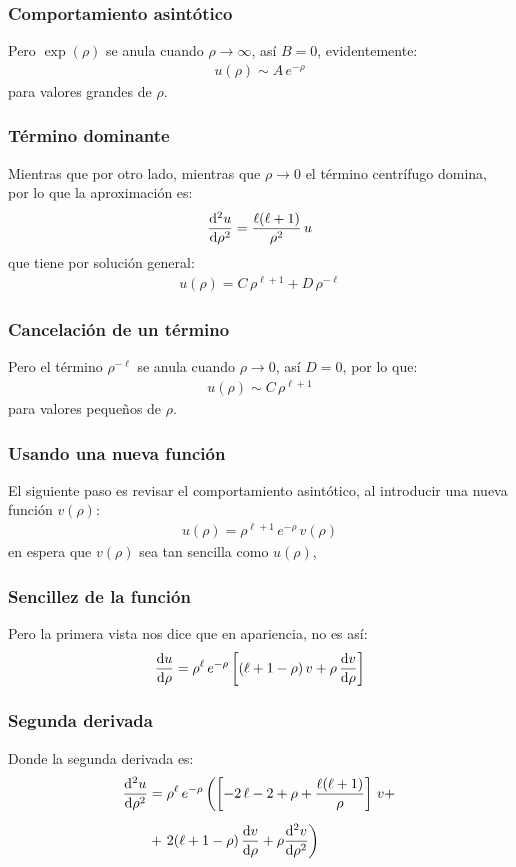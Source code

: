 \documentclass[12pt]{beamer}
\begin{document}
\begin{frame}
\frametitle{Comportamiento asintótico}
Pero $\exp (\rho)$ se anula cuando $\rho \to \infty$, así $B = 0$, evidentemente:
\begin{align}
u(\rho) \sim A \, e^{-\rho}
\label{eq:ecuacion_04_58}
\end{align}
para valores grandes de $\rho$. 
\end{frame}
\begin{frame}
\frametitle{Término dominante}
Mientras que por otro lado, mientras que $\rho \to 0$ el término centrífugo domina, por lo que la aproximación es:
\pause
\begin{align*}
\dv[2]{u}{\rho} = \dfrac{\ell (\ell + 1)}{\rho^{2}} \, u
\end{align*}
\pause
que tiene por solución general:
\begin{align*}
u (\rho) = C \, \rho^{\ell +1} + D \, \rho^{-\ell}
\end{align*}
\end{frame}
\begin{frame}
\frametitle{Cancelación de un término}
Pero el término $\rho^{-\ell}$ se anula cuando $\rho \to 0$, así $D = 0$, por lo que:
\pause
\begin{align}
u (\rho) \sim C \, \rho^{\ell + 1}
\label{eq:ecuacion_04_59}
\end{align}
para valores pequeños de $\rho$.
\end{frame}
\begin{frame}
\frametitle{Usando una nueva función}
El siguiente paso es revisar el comportamiento asintótico, al introducir una nueva función $v (\rho)$:
\pause
\begin{align}
u (\rho) = \rho^{\ell + 1} \, e^{-\rho} \, v (\rho)
\label{eq:ecuacion_04_60} 
\end{align}
en espera que $v (\rho)$ sea tan sencilla como $u (\rho)$,
\end{frame}
\begin{frame}
\frametitle{Sencillez de la función}
Pero la primera vista nos dice que en apariencia, no es así:
\pause
\begin{align*}
\dv{u}{\rho} = \rho^{\ell} \, e^{-\rho} \left[ (\ell + 1 - \rho) \, v + \rho \, \dv{v}{\rho} \right]
\end{align*}
\end{frame}
\begin{frame}
\frametitle{Segunda derivada}
Donde la segunda derivada es:
\pause
\begin{align*}
\dv[2]{u}{\rho} &= \rho^{\ell} \, e^{-\rho} \left( \left[ -2 \, \ell - 2 + \rho + \dfrac{ \ell (\ell + 1)}{\rho} \right] \, v + \right. \\[0.5em]
&+ \left. 2 (\ell + 1 - \rho) \, \dv{v}{\rho} + \rho \dv[2]{v}{\rho} \right)
\end{align*}
\end{frame}
\end{document}
